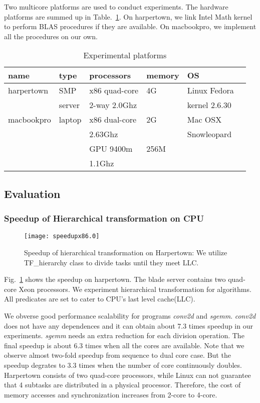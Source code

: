 Two multicore platforms are used to conduct experiments. The hardware
platforms are summed up in Table.~\ref{tbl:mach}. On harpertown, we link Intel Math kernel to perform BLAS procedures
if they are available. On macbookpro, we implement all the procedures on
our own. 

\begin{table}[hbt]
\caption{Experimental platforms}\label{tbl:mach}
\begin{center}
\begin{tabular}{|l|l|l|l|l|r|}
\hline
\textbf{name}&\textbf{type}&\textbf{processors}&\textbf{memory}&\textbf{OS}\\
\hline
harpertown&SMP &x86 quad-core  &4G&Linux Fedora\\
                  &  server &   
2-way  2.0Ghz & &kernel 2.6.30\\
\hline
macbookpro&laptop &x86 dual-core &2G&Mac OSX\\
                    &           & 2.63Ghz         &  &Snowleopard\\
                   &           &GPU 9400m    &256M & \\
                    &           & 1.1Ghz   & &\\
\hline
\end{tabular} 
\end{center}
\end{table}

\subsection{Evaluation}
\subsubsection{Speedup of Hierarchical transformation on CPU}
\begin{figure}
\texttt{[image: speedupx86.0]}
\caption{Speedup of hierarchical transformation on Harpertown: We
  utilize TF\_hierarchy class to divide tasks until they meet LLC.}\label{fig:spdx86}
\end{figure}

Fig.~\ref{fig:spdx86} shows the speedup on harpertown. The blade
server contains two quad-core Xeon
processors. We experiment hierarchical transformation for
algorithms. All predicates are set to cater to CPU's last level cache(LLC).

We obverse good performance scalability for programs
\textit{conv2d} and \textit{sgemm}. \textit{conv2d} does not have any dependences
and it can obtain about 7.3 times speedup in our experiments. \textit{sgemm}
needs an extra reduction for each division operation. The final
speedup is about 6.3 times when all the cores are available. Note that we
observe almost two-fold speedup from sequence to dual core case. But
the speedup degrates to 3.3 times when the number of core continuously
doubles. Harpertown consists of two quad-core processors,  while Linux
can not guarantee that 4 subtasks are distributed in a physical
processor. Therefore, the cost of memory accesses and synchronization
increases from 2-core to 4-core.


